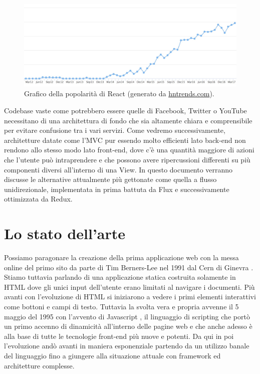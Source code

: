 \begin{figure}[h]
\centering 
\includegraphics[width=12.7cm]{./images/reactPopularity}
\caption{Grafico della popolarità di React (generato da \href{https://www.hntrends.com/}{hntrends.com}).}
\label{reactPopularity}
\end{figure}

\noindent
Codebase vaste come potrebbero essere quelle di Facebook, Twitter o YouTube necessitano di una architettura di fondo che sia altamente chiara e comprensibile per evitare confusione tra i vari servizi.
Come vedremo successivamente, architetture datate come l'MVC pur essendo molto efficienti lato back-end non rendono allo stesso modo lato front-end, dove c'è una quantità maggiore di azioni che l'utente può intraprendere e che possono avere ripercussioni differenti su più componenti diversi all'interno di una View.
In questo documento verranno discusse le alternative attualmente più gettonate come quella a flusso unidirezionale, implementata in prima battuta da Flux e successivamente ottimizzata da Redux.

\section{Lo stato dell'arte}
Possiamo paragonare la creazione della prima applicazione web con la messa online del primo sito da parte di Tim Berners-Lee nel 1991 dal Cern di Ginevra \cite{HuffingtonpostFirstWebsite}. Stiamo tuttavia parlando di una applicazione statica costruita solamente in HTML dove gli unici input dell'utente erano limitati al navigare i documenti. Più avanti con l'evoluzione di HTML si iniziarono a vedere i primi elementi interattivi come bottoni e campi di testo. Tuttavia la svolta vera e propria avvenne il 5 maggio del 1995 con l'avvento di Javascript \cite{W3cJavascriptHistory}, il linguaggio di scripting che portò un primo accenno di dinamicità all'interno delle pagine web e che anche adesso è alla base di tutte le tecnologie front-end più nuove e potenti. Da qui in poi l'evoluzione andò avanti in maniera esponenziale partendo da un utilizzo banale del linguaggio fino a giungere alla situazione attuale con framework ed architetture complesse.

